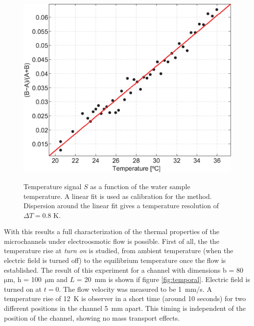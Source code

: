 \documentclass[twocolumn]{svjour3}       %
\begin{document}
\begin{figure}[h!]
\centering
\includegraphics[width=\columnwidth]{figs/calib.eps}
\label{fig:calib}
\caption{Temperature signal $S$ as a function of the water sample temperature. A linear fit is used as calibration for the method. Dispersion around the linear fit gives a temperature resolution of $\Delta T = 0.8$ K.}
\end{figure}

With this results a full characterization of the thermal properties of the microchannels under electroosmotic flow is possible. First of all, the the temperature rise at \textit{turn on} is studied, from ambient temperature (when the electric field is turned off) to the equilibrium temperature once the flow is established. The result of this experiment for a channel with dimensions b = 80~$\mathrm{\mu m}$, h = 100~$\mathrm{\mu m}$ and $L$ = 20~mm is shown if figure \ref{fig:temporal}. Electric field is turned on at $t = 0$. The flow velocity was measured to be 1~mm/s. A temperature rise of 12~K is observer in a short time (around 10 seconds) for two different positions in the channel 5~mm apart. This timing is independent of the position of the channel, showing no mass transport effects.
\end{document}
